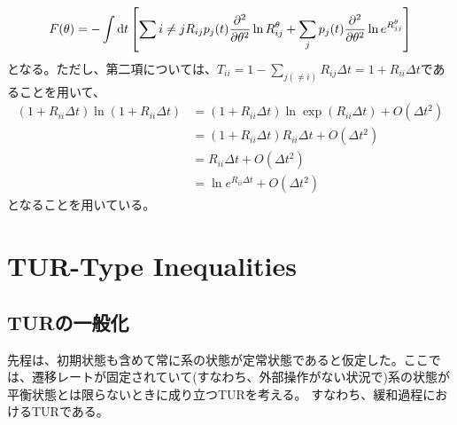 \documentclass[a4paper,11pt]{jsarticle}
\numberwithin{equation}{section}
\begin{document}
\begin{align}
    F(\theta) = -\int \dd{t} \qty[\sum{i \neq j} R_{ij} p_j(t) \pdv[2]{\theta} \ln R_{ij}^\theta + \sum_j p_j(t) \pdv[2]{\theta} \ln e^{R_{jj}^\theta}]
\end{align}
となる。ただし、第二項については、$T_{ii} = 1-\sum_{j(\neq i)} R_{ij}\Delta t =1 + R_{ii} \Delta t$であることを用いて、
\begin{align}
    (1+R_{ii}\Delta t )\ln (1+R_{ii}\Delta t) &= (1+R_{ii}\Delta t )\ln \exp(R_{ii}\Delta t) + O(\Delta t^2)\\
    &= (1+R_{ii}\Delta t )R_{ii} \Delta t + O(\Delta t^2)\\
    &= R_{ii} \Delta t + O(\Delta t^2)\\
    &= \ln e^{R_{ii}\Delta t} + O(\Delta t^2)
\end{align}
となることを用いている。

\section{TUR-Type Inequalities}
\subsection{TURの一般化}
先程は、初期状態も含めて常に系の状態が定常状態であると仮定した。ここでは、遷移レートが固定されていて(すなわち、外部操作がない状況で)系の状態が平衡状態とは限らないときに成り立つTURを考える。
すなわち、緩和過程におけるTURである。\\
\end{document}
